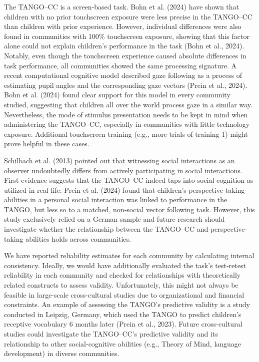 \documentclass[
  man,floatsintext]{apa7}
\begin{document}
The TANGO--CC is a screen-based task.
Bohn et al. (2024) have shown that children with no prior touchscreen exposure were less precise in the TANGO--CC than children with prior experience.
However, individual differences were also found in communities with 100\% touchscreen exposure, showing that this factor alone could not explain children's performance in the task (Bohn et al., 2024).
Notably, even though the touchscreen experience caused absolute differences in task performance, all communities showed the same processing signature.
A recent computational cognitive model described gaze following as a process of estimating pupil angles and the corresponding gaze vectors (Prein et al., 2024).
Bohn et al. (2024) found clear support for this model in every community studied, suggesting that children all over the world process gaze in a similar way.
Nevertheless, the mode of stimulus presentation needs to be kept in mind when administering the TANGO--CC, especially in communities with little technology exposure.
Additional touchscreen training (e.g., more trials of training 1) might prove helpful in these cases.

Schilbach et al. (2013) pointed out that witnessing social interactions as an observer undoubtedly differs from actively participating in social interactions.
First evidence suggests that the TANGO--CC indeed taps into social cognition as utilized in real life: Prein et al. (2024) found that children's perspective-taking abilities in a personal social interaction was linked to performance in the TANGO, but less so to a matched, non-social vector following task.
However, this study exclusively relied on a German sample and future research should investigate whether the relationship between the TANGO--CC and perspective-taking abilities holds across communities.

We have reported reliability estimates for each community by calculating internal consistency.
Ideally, we would have additionally evaluated the task's test-retest reliability in each community and checked for relationships with theoretically related constructs to assess validity.
Unfortunately, this might not always be feasible in large-scale cross-cultural studies due to organizational and financial constraints.
An example of assessing the TANGO's predictive validity is a study conducted in Leipzig, Germany, which used the TANGO to predict children's receptive vocabulary 6 months later (Prein et al., 2023).
Future cross-cultural studies could investigate the TANGO--CC's predictive validity and its relationship to other social-cognitive abilities (e.g., Theory of Mind, language development) in diverse communities.
\end{document}
